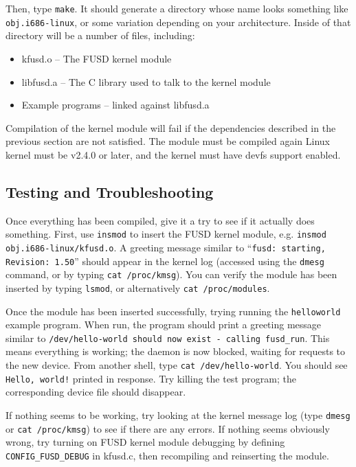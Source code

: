 \documentclass{article}
\begin{document}
Then, type {\tt make}.  It should generate a directory whose name
looks something like {\tt obj.i686-linux}, or some variation depending
on your architecture.  Inside of that directory will be a number of
files, including:
\begin{itemize}
\item kfusd.o -- The FUSD kernel module
\item libfusd.a -- The C library used to talk to the kernel module
\item Example programs -- linked against libfusd.a
\end{itemize}

Compilation of the kernel module will fail if the dependencies
described in the previous section are not satisfied.  The module must
be compiled again Linux kernel must be v2.4.0 or later, and the kernel
must have devfs support enabled.


\subsection{Testing and Troubleshooting}

Once everything has been compiled, give it a try to see if it actually
does something.  First, use {\tt insmod} to insert the FUSD kernel
module, e.g. {\tt insmod obj.i686-linux/kfusd.o}.  A greeting message
similar to ``{\tt fusd: starting, Revision: 1.50}'' should appear in
the kernel log (accessed using the {\tt dmesg} command, or by typing
{\tt cat /proc/kmsg}).  You can verify the module has been inserted by
typing {\tt lsmod}, or alternatively {\tt cat /proc/modules}.

Once the module has been inserted successfully, trying running the
{\tt helloworld} example program.  When run, the program should print
a greeting message similar to {\tt /dev/hello-world should now exist -
calling fusd\_run}.  This means everything is working; the daemon is
now blocked, waiting for requests to the new device.  From another
shell, type {\tt cat /dev/hello-world}.  You should see {\tt Hello,
world!} printed in response.  Try killing the test program; the
corresponding device file should disappear.

If nothing seems to be working, try looking at the kernel message log
(type {\tt dmesg} or {\tt cat /proc/kmsg}) to see if there are any
errors.  If nothing seems obviously wrong, try turning on FUSD kernel
module debugging by defining {\tt CONFIG\_FUSD\_DEBUG} in kfusd.c,
then recompiling and reinserting the module.
\end{document}
